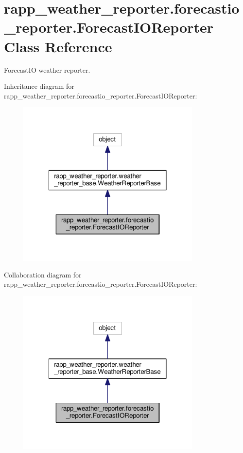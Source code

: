 \hypertarget{classrapp__weather__reporter_1_1forecastio__reporter_1_1ForecastIOReporter}{\section{rapp\-\_\-weather\-\_\-reporter.\-forecastio\-\_\-reporter.\-Forecast\-I\-O\-Reporter Class Reference}
\label{classrapp__weather__reporter_1_1forecastio__reporter_1_1ForecastIOReporter}
}


Forecast\-I\-O weather reporter.  




Inheritance diagram for rapp\-\_\-weather\-\_\-reporter.\-forecastio\-\_\-reporter.\-Forecast\-I\-O\-Reporter\-:
\nopagebreak
\begin{figure}[H]
\begin{center}
\leavevmode
\includegraphics[width=260pt]{classrapp__weather__reporter_1_1forecastio__reporter_1_1ForecastIOReporter__inherit__graph}
\end{center}
\end{figure}


Collaboration diagram for rapp\-\_\-weather\-\_\-reporter.\-forecastio\-\_\-reporter.\-Forecast\-I\-O\-Reporter\-:
\nopagebreak
\begin{figure}[H]
\begin{center}
\leavevmode
\includegraphics[width=260pt]{classrapp__weather__reporter_1_1forecastio__reporter_1_1ForecastIOReporter__coll__graph}
\end{center}
\end{figure}
